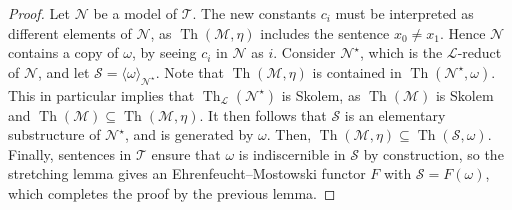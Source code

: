 \begin{proof}
	Let \( \mathcal N \) be a model of \( \mathcal T \).
	The new constants \( c_i \) must be interpreted as different elements of \( \mathcal N \), as \( \operatorname{Th}(\mathcal M, \eta) \) includes the sentence \( x_0 \neq x_1 \).
	Hence \( \mathcal N \) contains a copy of \( \omega \), by seeing \( c_i \) in \( \mathcal N \) as \( i \).
	Consider \( \mathcal N^\star \), which is the \( \mathcal L \)-reduct of \( \mathcal N \), and let \( \mathcal S = \langle \omega \rangle_{\mathcal N^\star} \).
	Note that \( \operatorname{Th}(\mathcal M, \eta) \) is contained in \( \operatorname{Th}(\mathcal N^\star, \omega) \).
	This in particular implies that \( \operatorname{Th}_{\mathcal L}(\mathcal N^\star) \) is Skolem, as \( \operatorname{Th}(\mathcal M) \) is Skolem and \( \operatorname{Th}(\mathcal M) \subseteq \operatorname{Th}(\mathcal M, \eta) \).
	It then follows that \( \mathcal S \) is an elementary substructure of \( \mathcal N^\star \), and is generated by \( \omega \).
	Then, \( \operatorname{Th}(\mathcal M, \eta) \subseteq \operatorname{Th}(\mathcal S, \omega) \).
	Finally, sentences in \( \mathcal T \) ensure that \( \omega \) is indiscernible in \( \mathcal S \) by construction, so the stretching lemma gives an Ehrenfeucht--Mostowski functor \( F \) with \( \mathcal S = F(\omega) \), which completes the proof by the previous lemma.
\end{proof}
